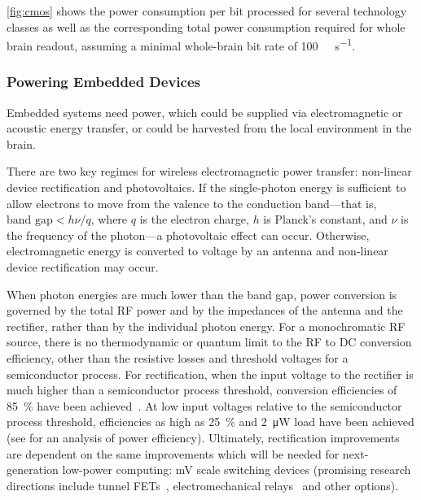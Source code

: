 \autoref{fig:cmos} shows the power consumption per bit processed for several technology classes as well as the corresponding total power consumption required for whole brain readout, assuming a minimal whole-brain bit rate of \SI{100}{\giga\bit\per\second}.

\subsubsection{Powering Embedded Devices}

Embedded systems need power, which could be supplied via electromagnetic or acoustic energy transfer, or could be harvested from the local environment in the brain.

There are two key regimes for wireless electromagnetic power transfer: non-linear device rectification and photovoltaics.
If the single-photon energy is sufficient to allow electrons to move from the valence to the conduction band---that is, $\text{band gap} < h\nu/q$, where $q$ is the electron charge, $h$ is Planck's constant, and $\nu$ is the frequency of the photon---a photovoltaic effect can occur.
Otherwise, electromagnetic energy is converted to voltage by an antenna and non-linear device rectification may occur.

When photon energies  are much lower than the band gap, power conversion is governed by the total RF power and by the impedances of the antenna and the rectifier, rather than by the individual photon energy.
For a monochromatic RF source, there is no thermodynamic or quantum limit to the RF to DC conversion efficiency, other than the resistive losses and threshold voltages for a semiconductor process.
For rectification, when the input voltage to the rectifier is much higher than a semiconductor process threshold, conversion efficiencies of \SI{85}{\percent} have been achieved~\cite{sun02}.
At low input voltages relative to the semiconductor process threshold, efficiencies as high as \SI{25}{\percent} and \SI{2}{\micro\watt} load have been achieved (see \cite{mandal07} for an analysis of power efficiency).
Ultimately, rectification improvements are dependent on the same improvements which will be needed for next-generation low-power computing: \si{\milli\volt} scale switching devices (promising research directions include tunnel FETs~\cite{ionescu11}, electromechanical relays~\cite{liu12} and other options). 

